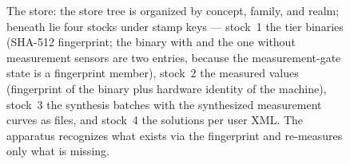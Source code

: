 \begin{nurlang}
\begin{figure}[htbp]
\caption{The store: the store tree is organized by concept, family, and realm; beneath lie four stocks under stamp keys --- stock~1 the tier binaries (SHA-512 fingerprint; the binary with and the one without measurement sensors are two entries, because the measurement-gate state is a fingerprint member), stock~2 the measured values (fingerprint of the binary plus hardware identity of the machine), stock~3 the synthesis batches with the synthesized measurement curves as files, and stock~4 the solutions per user XML\@. The apparatus recognizes what exists via the fingerprint and re-measures only what is missing.}\label{fig:lager-bestaende}
\end{figure}
\end{nurlang}
